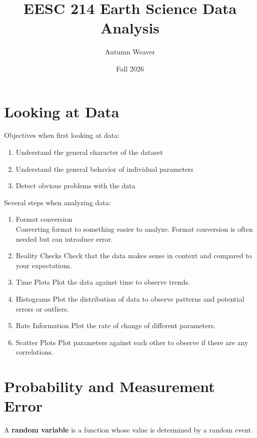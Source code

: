 \documentclass{article}
\title{\textbf{EESC 214 Earth Science Data Analysis}}
\author{Autumn Weaver}
\date{Fall 2026}
\begin{document}
\maketitle

\tableofcontents{\textbf{}}

\pagebreak

\pagestyle{fancy}
\fancyhead{}
\fancyhead[L]{\thetitle}

\section{Looking at Data}
Objectives when first looking at data:
\begin{enumerate}
    \item Understand the general character of the dataset 
    \item Understand the general behavior of individual parameters
    \item Detect obvious problems with the data
\end{enumerate}

Several steps when analyzing data:
\begin{enumerate}
    \item Format conversion \\
    Converting format to something easier to analyze. Format conversion is often needed but can introduce error. 
    \item Reality Checks 
    Check that the data makes sense in context and compared to your expectations.
    \item Time Plots
    Plot the data against time to observe trends.
    \item Histograms
    Plot the distribution of data to observe patterns and potential errors or outliers.
    \item Rate Information
    Plot the rate of change of different parameters.
    \item Scatter Plots
    Plot parameters against each other to observe if there are any correlations.
\end{enumerate}

\section{Probability and Measurement Error}
\begin{definition}
    A \textbf{random variable} is a function whose value is determined by a random event.
\end{definition}
\end{document}
